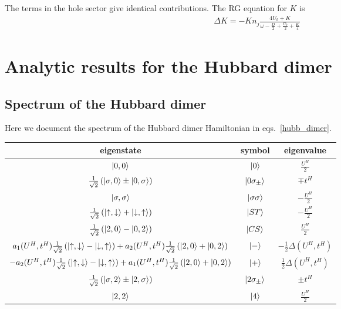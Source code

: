 \documentclass{report}
\numberwithin{equation}{section}
\begin{document}
\begin{appendices}
The terms in the hole sector give identical contributions. The RG equation for \(K\) is
\begin{equation}\begin{aligned}
	\Delta K = -K n_j\frac{4 U_b + K}{\omega - \frac{D}{2} + \frac{U_b}{2} + \frac{K}{4}}
\end{aligned}\end{equation}

\chapter{Analytic results for the Hubbard dimer}
\section*{Spectrum of the Hubbard dimer}
Here we document the spectrum of the Hubbard dimer Hamiltonian in eqs.~\ref{hubb_dimer}.
\begin{center}
	\begin{tabular}{|c|c|c|}
	\hline
	eigenstate & symbol & eigenvalue \\
	\hline
	$\ket{0,0}$ & $\ket{0}$ & \( \frac{U^H}{2}\)\\
	$ \frac{1}{\sqrt 2}\left(\ket{\sigma,0} \pm \ket{0,\sigma}\right)$ & $\ket{0\sigma_\pm}$ & \(\mp t^H\)\\
	$\ket{\sigma,\sigma}$ & $\ket{\sigma\sigma}$ & \( -\frac{U^H}{2}\)\\
	$ \frac{1}{\sqrt 2}\left(\ket{\uparrow,\downarrow} + \ket{\downarrow,\uparrow}\right)$ & $\ket{ST}$ & \( -\frac{U^H}{2}\)\\
	$ \frac{1}{\sqrt 2}\left(\ket{2,0} - \ket{0,2}\right)$ & $\ket{CS}$ & \( \frac{U^H}{2}\)\\
	$a_1(U^H, t^H) \frac{1}{\sqrt 2}\left(\ket{\uparrow,\downarrow} - \ket{\downarrow,\uparrow}\right) + a_2(U^H, t^H)\frac{1}{\sqrt 2}\left(\ket{2,0} + \ket{0,2}\right)$ & $\ket{-}$ & \(-\frac{1}{2}\Delta(U^H, t^H)\)\\
	$-a_2(U^H, t^H) \frac{1}{\sqrt 2}\left(\ket{\uparrow,\downarrow} - \ket{\downarrow,\uparrow}\right) + a_1(U^H, t^H)\frac{1}{\sqrt 2}\left(\ket{2,0} + \ket{0,2}\right)$ & $\ket{+}$ & \(\frac{1}{2}\Delta(U^H, t^H)\)\\
	$ \frac{1}{\sqrt 2}\left(\ket{\sigma,2} \pm \ket{2,\sigma}\right)$ & $\ket{2\sigma_\pm}$ & \(\pm t^H\)\\
	$\ket{2,2}$ & $\ket{4}$ & \( \frac{U^H}{2}\)\\
\hline
	\end{tabular}
	\label{hubb_dim_spectrum}
\end{center}

\end{appendices}
\end{document}
